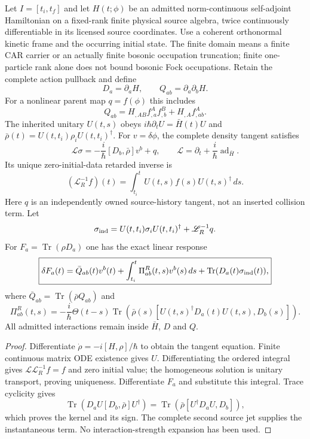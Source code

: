 \documentclass[12pt,a4paper]{article}
\begin{document}
\begin{theorem}
\label{p4:thm:v4104-finite-interacting-source-response}
Let $I=[t_i,t_f]$ and let $H(t;\phi)$ be an admitted norm-continuous
self-adjoint Hamiltonian on a fixed-rank finite physical source algebra,
twice continuously differentiable in its licensed source coordinates.
Use a coherent orthonormal kinetic frame and the occurring initial state.
The finite domain means a finite CAR carrier or an actually finite bosonic
occupation truncation; finite one-particle rank alone does not bound bosonic
Fock occupations.  Retain the complete action pullback and define
\[
 D_a=\partial_aH,\qquad Q_{ab}=\partial_a\partial_bH.
\]
For a nonlinear parent map $q=f(\phi)$ this includes
\[
 Q_{ab}=H_{,AB}f^A_{,a}f^B_{,b}+H_{,A}f^A_{,ab}.
\]
The inherited unitary $U(t,s)$ obeys $i\hbar\partial_tU=\bar H(t)U$ and
$\bar\rho(t)=U(t,t_i)\rho_iU(t,t_i)^\dagger$.
For $v=\delta\phi$, the complete density tangent satisfies
\[
 \mathscr L\sigma=-\frac{i}{\hbar}[D_b,\bar\rho]v^b+q,
 \qquad \mathscr L=\partial_t+\frac{i}{\hbar}\operatorname{ad}_{\bar H}.
\]
Its unique zero-initial-data retarded inverse is
\[
 \boxed{(\mathscr L_R^{-1}f)(t)=
 \int_{t_i}^{t}U(t,s)f(s)U(t,s)^\dagger\,ds.}
\]
Here $q$ is an independently owned source-history tangent, not an inserted
collision term.  Let
\[
 \sigma_{\rm ind}=U(t,t_i)\sigma_iU(t,t_i)^\dagger+
                  \mathscr L_R^{-1}q.
\]
For $F_a=\operatorname{Tr}(\rho D_a)$ one has the exact linear response
\[
 \boxed{\delta F_a(t)=\bar Q_{ab}(t)v^b(t)
 +\int_{t_i}^{t}\Pi^R_{ab}(t,s)v^b(s)\,ds
 +\operatorname{Tr}(D_a(t)\sigma_{\rm ind}(t)),}
\]
where $\bar Q_{ab}=\operatorname{Tr}(\bar\rho Q_{ab})$ and
\[
 \boxed{\Pi^R_{ab}(t,s)=-\frac{i}{\hbar}\Theta(t-s)
 \operatorname{Tr}\!\left(\bar\rho(s)
 [U(t,s)^\dagger D_a(t)U(t,s),D_b(s)]\right).}
\]
All admitted interactions remain inside $\bar H$, $D$ and $Q$.
\end{theorem}
\begin{proof}
Differentiate $\dot\rho=-i[H,\rho]/\hbar$ to obtain the tangent equation.
Finite continuous matrix ODE existence gives $U$.  Differentiating the ordered
integral gives $\mathscr L\mathscr L_R^{-1}f=f$ and zero initial value;
the homogeneous solution is unitary transport, proving uniqueness.
Differentiate $F_a$ and substitute this integral.  Trace cyclicity gives
\[
 \operatorname{Tr}(D_aU[D_b,\bar\rho]U^\dagger)
 =\operatorname{Tr}(\bar\rho[U^\dagger D_aU,D_b]),
\]
which proves the kernel and its sign.  The complete second source jet supplies
the instantaneous term.  No interaction-strength expansion has been used.
\end{proof}
\end{document}
